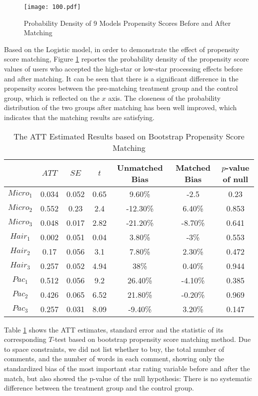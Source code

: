 \documentclass{mcmthesis}
\begin{document}
\begin{figure}[H]
	\small
	\centering
	\texttt{[image: 100.pdf]}
	\caption{Probability Density of 9 Models Propensity Scores Before and After Matching} 
	\label{fig:100}
\end{figure}
Based on the Logistic model, in order to demonstrate the effect of propensity score matching, Figure \ref{fig:100} reportes the probability density of the propensity score values of users who accepted the high-star or low-star processing effects before and after matching. It can be seen that there is a significant difference in the propensity scores between the pre-matching treatment group and the control group, which is reflected on the $x$ axis. The closeness of the probability distribution of the two groups after matching has been well improved, which indicates that the matching results are satisfying.




\begin{table}[htbp]
	\centering
	\caption{The ATT Estimated Results based on Bootstrap Propensity Score Matching}
	\begin{tabular}{ccccccc}
		\toprule[2pt]
		& $ ATT $   & $ SE $    & $ t $  & Unmatched Bias & Matched Bias & $ p $-value of null \\ \hline
		$ Micro_1 $ & 0.034 & 0.052 & 0.65        & 9.60\%         & -2.5         & 0.23                \\
		$ Micro_2 $ & 0.552 & 0.23  & 2.4         & -12.30\%       & 6.40\%       & 0.853               \\
		$ Micro_3 $ & 0.048 & 0.017 & 2.82        & -21.20\%       & -8.70\%      & 0.641               \\
		$ Hair_1 $  & 0.002 & 0.051 & 0.04        & 3.80\%         & -3\%         & 0.553               \\
		$ Hair_2 $  & 0.17  & 0.056 & 3.1         & 7.80\%         & 2.30\%       & 0.472               \\
		$ Hair_3 $  & 0.257 & 0.052 & 4.94        & 38\%           & 0.40\%       & 0.944               \\
		$ Pac_1 $   & 0.512 & 0.056 & 9.2         & 26.40\%        & -4.10\%      & 0.385               \\
		$ Pac_2 $   & 0.426 & 0.065 & 6.52        & 21.80\%        & -0.20\%      & 0.969               \\
		$ Pac_3 $   & 0.257 & 0.031 & 8.09        & -9.40\%        & 3.20\%       & 0.147               \\ \bottomrule[2pt]
	\end{tabular}
\label{tab:100}
\end{table}        
Table \ref{tab:100} shows the ATT estimates, standard error and the statistic of its corresponding $T$-test based on bootstrap propensity score matching method. Due to space constraints, we did not list whether to buy, the total number of comments, and the number of words in each comment, showing only the standardized bias of the most important star rating variable before and after the match, but also showed the p-value of the null hypothesis: There is no systematic difference between the treatment group and the control group.
\end{document}
